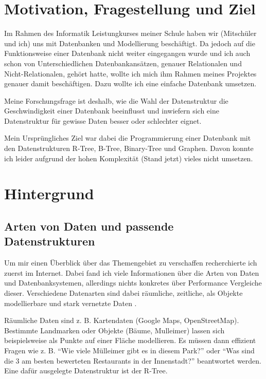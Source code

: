 \documentclass[11pt,a4paper]{article}
\begin{document}
\clearpage

\pagestyle{plain}

\section{Motivation, Fragestellung und Ziel}

Im Rahmen des Informatik Leistungkurses meiner Schule haben wir (Mitschüler und ich) uns
mit Datenbanken und Modellierung beschäftigt. Da jedoch auf die Funktionsweise einer
Datenbank nicht weiter eingegangen wurde und ich auch schon von Unterschiedlichen
Datenbankansätzen, genauer Relationalen und Nicht-Relationalen, gehört hatte,
wollte ich mich ihm Rahmen meines Projektes genauer damit beschäftigen.
Dazu wollte ich eine einfache Datenbank umsetzen.

\vspace*{0.3cm}

Meine Forschungsfrage ist deshalb, wie die Wahl der Datenstruktur die
Geschwindigkeit einer Datenbank beeinflusst und inwiefern sich eine Datenstruktur
für gewisse Daten besser oder schlechter eignet.

\vspace*{0.3cm}

Mein Ursprüngliches Ziel war dabei die Programmierung einer Datenbank
mit den Datenstrukturen R-Tree, B-Tree, Binary-Tree und Graphen.
Davon konnte ich leider aufgrund der hohen Komplexität (Stand jetzt) vieles nicht umsetzen.

\section{Hintergrund}

\subsection{Arten von Daten und passende Datenstrukturen}

Um mir einen Überblick über das Themengebiet zu verschaffen recherchierte ich zuerst im Internet.
Dabei fand ich viele Informationen über die Arten von Daten und Datenbanksystemen,
allerdings nichts konkretes über Performance Vergleiche dieser.
Verschiedene Datenarten sind dabei räumliche, zeitliche, als Objekte modellierbare und stark vernetzte Daten
\cite{no_sql_wikipedia} \cite{indian_overview}.

\vspace*{0.3cm}

Räumliche Daten sind z. B. Kartendaten (Google Maps, OpenStreetMap). Bestimmte Landmarken oder Objekte
(Bäume, Mulleimer) lassen sich beispielsweise als Punkte auf einer Fläche modellieren.
Es müssen dann effizient Fragen wie z. B. ``Wie viele Mülleimer gibt es in diesem Park?'' oder ``Was sind
die 3 am besten bewerteten Restaurants in der Innenstadt?'' beantwortet werden.
Eine dafür ausgelegte Datenstruktur ist der R-Tree.
\end{document}
